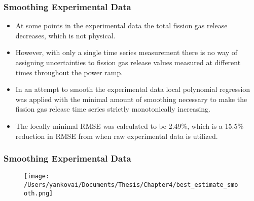 \begin{frame}
\frametitle{Smoothing Experimental Data}

\begin{itemize}
  \item At some points in the experimental data the total fission gas release decreases, which is not physical. 
  \item However, with only a single time series measurement there is no way of assigning uncertainties to fission gas release values measured at different times throughout the power ramp. 
  \item In an attempt to smooth the experimental data local polynomial regression was applied with the minimal amount of smoothing necessary to make the fission gas release time series strictly monotonically increasing. 
  \item The locally minimal RMSE was calculated to be 2.49\%, which is a 15.5\% reduction in RMSE from when raw experimental data is utilized.
\end{itemize}

\end{frame}
\begin{frame}
\frametitle{Smoothing Experimental Data}

\begin{figure}
  \texttt{[image: /Users/yankovai/Documents/Thesis/Chapter4/best\_estimate\_smooth.png]}
\end{figure}

\end{frame}
